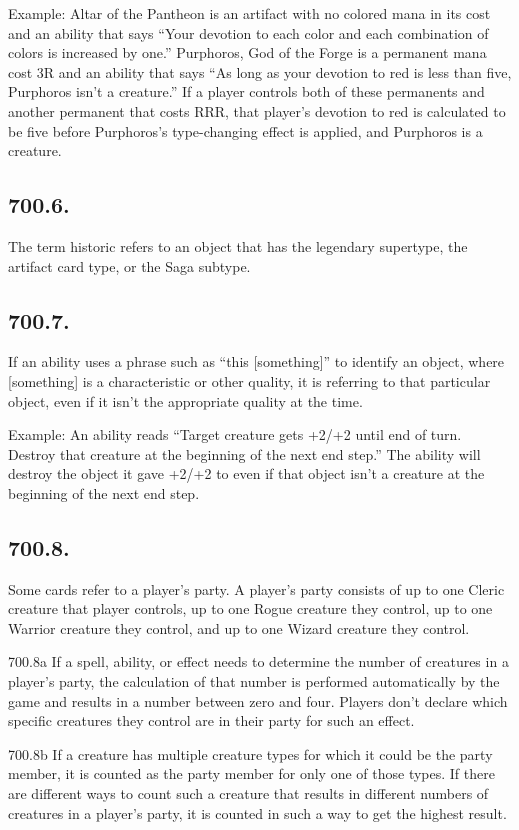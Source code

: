 Example: Altar of the Pantheon is an artifact with no colored mana in its cost and an ability that says “Your devotion to each color and each combination of colors is increased by one.” Purphoros, God of the Forge is a permanent mana cost {3}{R} and an ability that says “As long as your devotion to red is less than five, Purphoros isn’t a creature.” If a player controls both of these permanents and another permanent that costs {R}{R}{R}, that player’s devotion to red is calculated to be five before Purphoros’s type-changing effect is applied, and Purphoros is a creature.

\subsection*{700.6.}
The term historic refers to an object that has the legendary supertype, the artifact card type, or the Saga subtype.

\subsection*{700.7.}
If an ability uses a phrase such as “this [something]” to identify an object, where [something] is a characteristic or other quality, it is referring to that particular object, even if it isn’t the appropriate quality at the time.

Example: An ability reads “Target creature gets +2/+2 until end of turn. Destroy that creature at the beginning of the next end step.” The ability will destroy the object it gave +2/+2 to even if that object isn’t a creature at the beginning of the next end step.

\subsection*{700.8.}
Some cards refer to a player’s party. A player’s party consists of up to one Cleric creature that player controls, up to one Rogue creature they control, up to one Warrior creature they control, and up to one Wizard creature they control.

700.8a If a spell, ability, or effect needs to determine the number of creatures in a player’s party, the calculation of that number is performed automatically by the game and results in a number between zero and four. Players don’t declare which specific creatures they control are in their party for such an effect.

700.8b If a creature has multiple creature types for which it could be the party member, it is counted as the party member for only one of those types. If there are different ways to count such a creature that results in different numbers of creatures in a player’s party, it is counted in such a way to get the highest result.

